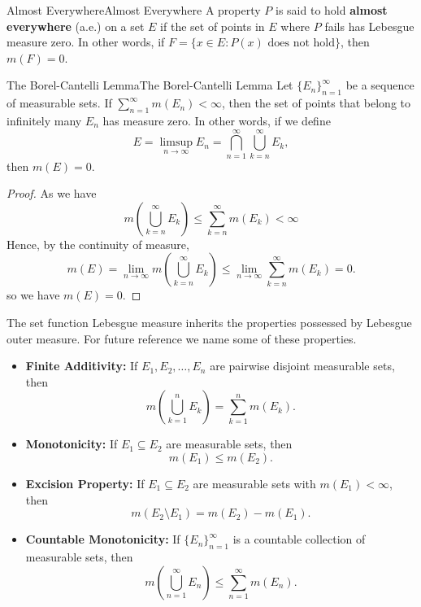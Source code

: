 \documentclass[../main.tex]{subfiles}
\begin{document}
\begin{definition}{Almost Everywhere}{Almost Everywhere}
  A property $P$ is said to hold \textbf{almost everywhere} (a.e.) on a set $E$ if the set of points in $E$ where $P$ fails has Lebesgue measure zero. In other words, if $F = \{x \in E : P(x) \text{ does not hold}\}$, then $m(F) = 0$.
\end{definition}

\begin{lemma}{The Borel-Cantelli Lemma}{The Borel-Cantelli Lemma}
  Let $\{E_n\}_{n=1}^{\infty}$ be a sequence of measurable sets. If $\sum_{n=1}^{\infty} m(E_n) < \infty$, then the set of points that belong to infinitely many $E_n$ has measure zero. In other words, if we define
  \begin{equation}
    E = \limsup_{n \to \infty} E_n = \bigcap_{n=1}^{\infty} \bigcup_{k=n}^{\infty} E_k,
  \end{equation}
  then $m(E) = 0$.
\end{lemma}
\begin{proof}
  As we have
  \begin{equation*}
    m\left( \bigcup_{k=n}^{\infty} E_k \right) \leq \sum_{k=n}^{\infty} m(E_k) < \infty
  \end{equation*}
  Hence, by the continuity of measure,
  \begin{equation*}
    m(E) = \lim_{n \to \infty} m\left( \bigcup_{k=n}^{\infty} E_k \right) \leq \lim_{n \to \infty} \sum_{k=n}^{\infty} m(E_k) = 0.
  \end{equation*}
  so we have $m(E) = 0$.
\end{proof}

The set function Lebesgue measure inherits the properties possessed by Lebesgue outer measure. For future reference we name some of these properties.
\begin{itemize}
  \item \textbf{Finite Additivity:} If $E_1, E_2, \ldots, E_n$ are pairwise disjoint measurable sets, then
    \begin{equation}
      m\left(\bigcup_{k=1}^{n} E_k\right) = \sum_{k=1}^{n} m(E_k).
    \end{equation}
  \item \textbf{Monotonicity:} If $E_1 \subseteq E_2$ are measurable sets, then
    \begin{equation}
      m(E_1) \leq m(E_2).
    \end{equation}
  \item \textbf{Excision Property:} If $E_1 \subseteq E_2$ are measurable sets with $m(E_1) < \infty$, then
    \begin{equation}
      m(E_2 \setminus E_1) = m(E_2) - m(E_1).
    \end{equation}
  \item \textbf{Countable Monotonicity:} If $\{E_n\}_{n=1}^{\infty}$ is a countable collection of measurable sets, then
    \begin{equation}
      m\left(\bigcup_{n=1}^{\infty} E_n\right) \leq \sum_{n=1}^{\infty} m(E_n).
    \end{equation}
\end{itemize}
\end{document}
